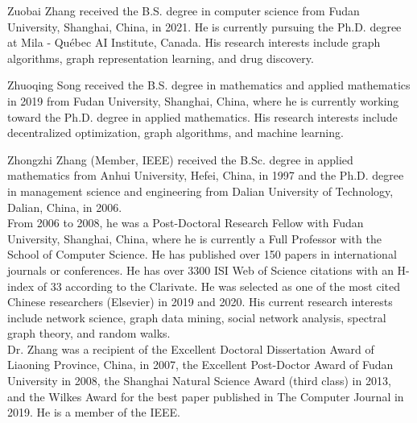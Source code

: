\documentclass[10pt,journal,compsoc,twocolumn,twoside]{IEEEtran}
\newcommand{\biophoto}[1]{\texttt{[image: \#1]}}
\begin{document}
\begin{IEEEbiography}{Zuobai Zhang}
    received the B.S. degree  in computer science from Fudan University, Shanghai, China, in 2021. 	He is currently pursuing the Ph.D. degree at Mila - Qu\'{e}bec AI Institute, Canada. His research interests include graph algorithms, graph representation learning, and drug discovery.
\end{IEEEbiography}

\begin{IEEEbiography}{Zhuoqing Song}
    received the B.S. degree in mathematics and applied mathematics in 2019 from Fudan University, Shanghai, China, where he is currently working toward the Ph.D. degree in applied mathematics. His research interests include decentralized optimization, graph algorithms, and machine learning.
\end{IEEEbiography}

\begin{IEEEbiography}[\biophoto{zzz.jpg}]{Zhongzhi Zhang}
    (Member, IEEE) received the B.Sc. degree in applied mathematics from Anhui University, Hefei, China, in 1997 and the Ph.D. degree in management science and engineering from Dalian University of Technology, Dalian, China, in 2006. \\
    From 2006 to 2008, he was a Post-Doctoral Research Fellow with Fudan University, Shanghai, China, where he is currently a Full Professor with the School of Computer Science. He has published over 150 papers in international journals or conferences. He has over 3300 ISI Web of Science citations with an H-index of 33 according to the Clarivate. He was selected as one of the most cited Chinese researchers
    (Elsevier) in 2019 and 2020. His current research interests include network science, graph data mining, social network analysis, spectral graph theory, and random walks. \\
    Dr. Zhang was a recipient of the Excellent Doctoral Dissertation Award of Liaoning Province, China, in 2007, the Excellent Post-Doctor Award of Fudan University in 2008, the Shanghai Natural Science Award (third class) in 2013, and the Wilkes Award for the best paper published in The Computer Journal in 2019. He is a member of the IEEE.
\end{IEEEbiography}
\end{document}
